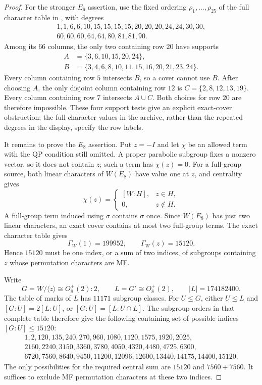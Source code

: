 \documentclass[11pt]{article}
\numberwithin{equation}{section}
\theoremstyle{definition}
\begin{document}
\begin{proof}
For the stronger \(E_6\) assertion, use the fixed ordering
\(\rho_1,\ldots,\rho_{25}\) of the full character table in \cite{ZhangData}, with degrees
\[
\begin{gathered}
1,1,6,6,10,15,15,15,15,20,20,20,24,24,30,30,\\
60,60,60,64,64,80,81,81,90.
\end{gathered}
\]
Among its \(66\) columns, the only two containing row \(20\) have supports
\[
\begin{aligned}
 A&=\{3,6,10,15,20,24\},\\
 B&=\{3,4,6,8,10,11,15,16,20,21,23,24\}.
\end{aligned}
\]
Every column containing row \(5\) intersects \(B\), so a cover cannot use \(B\).
After choosing \(A\), the only disjoint column containing row \(12\) is
\(C=\{2,8,12,13,19\}\).
Every column containing row \(7\) intersects \(A\cup C\).
Both choices for row \(20\) are therefore impossible.
These four support tests give an explicit exact-cover obstruction; the full character values in the archive, rather than the repeated degrees in the display, specify the row labels.

It remains to prove the \(E_8\) assertion.
Put \(z=-I\) and let \(\chi\) be an allowed term with the QP condition still omitted.
A proper parabolic subgroup fixes a nonzero vector, so it does not contain \(z\); such a term has \(\chi(z)=0\).
For a full-group source, both linear characters of \(W(E_8)\) have value one at \(z\), and centrality gives
\begin{equation}
 \chi(z)=
 \begin{cases}
 [W:H],&z\in H,\\
 0,&z\notin H.
 \end{cases}
 \label{eq:E8centralterm}
\end{equation}
A full-group term induced using \(\sigma\) contains \(\sigma\) once.
Since \(W(E_8)\) has just two linear characters, an exact cover contains at most two full-group terms.
The exact character table gives
\[
 \Gamma_W(1)=199952,\qquad\Gamma_W(z)=15120.
\]
Hence \(15120\) must be one index, or a sum of two indices, of subgroups containing \(z\) whose permutation characters are MF.

Write
\[
 G=W/\langle z\rangle\cong O_8^+(2):2,
 \qquad L=G'\cong O_8^+(2),\qquad |L|=174182400.
\]
The table of marks of \(L\) has \(11171\) subgroup classes.
For \(U\leq G\), either \(U\leq L\) and \([G:U]=2[L:U]\), or
\([G:U]=[L:U\cap L]\).
The subgroup orders in that complete table therefore give the following containing set of possible indices \([G:U]\leq15120\):
\begin{equation}
\begin{gathered}
1,2,120,135,240,270,960,1080,1120,1575,1920,2025,\\
2160,2240,3150,3360,3780,4050,4320,4480,4725,6300,\\
6720,7560,8640,9450,11200,12096,12600,13440,14175,14400,15120.
\end{gathered}
\label{eq:E8indices}
\end{equation}
The only possibilities for the required central sum are \(15120\) and \(7560+7560\).
It suffices to exclude MF permutation characters at these two indices.


\end{proof}
\end{document}
